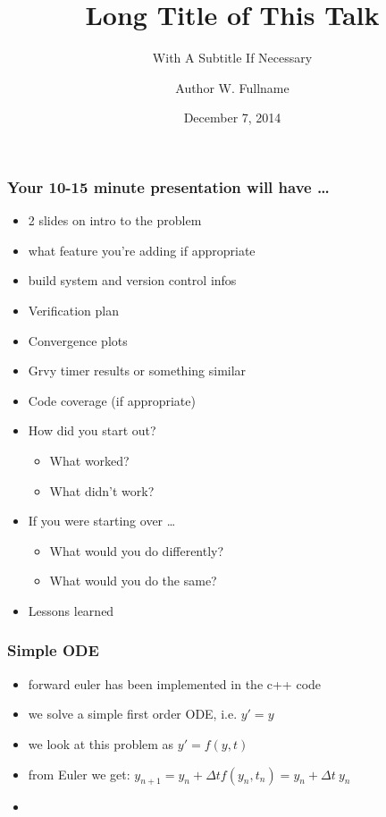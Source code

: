 \documentclass[mathserif]{beamer}
\date{December 7, 2014}
\author[A. W. Fullname]{Author W. Fullname}
\institute{The University of Texas at Austin}
\title[Short Title]{Long Title of This Talk}
\subtitle{With A Subtitle If Necessary}
\begin{document}
\begin{frame}
\begin{center}
\end{center}
\titlepage
\begin{flushright}
\end{flushright}
\end{frame}

\begin{frame}
\frametitle{Your 10-15 minute presentation will have \ldots}

\begin{itemize}
\item 2 slides on intro to the problem
\item what feature you're adding if appropriate
\item build system and version control infos
\item Verification plan
\item Convergence plots
\item Grvy timer results or something similar
\item Code coverage (if appropriate)
\item How did you start out?
\begin{itemize}
\item What worked?
\item What didn't work?
\end{itemize}
\item If you were starting over \ldots
\begin{itemize}
\item What would you do differently?
\item What would you do the same?
\end{itemize}
\item Lessons learned
\end{itemize}

\end{frame}

\begin{frame}
\frametitle{Simple ODE}

\begin{itemize}
\item forward euler has been implemented in the c++ code
\item we solve a simple first order ODE, i.e. $y'=y$
\item we look at this problem as $y' = f(y,t)$
\item from Euler we get: $y_{n+1} = y_n + \Delta t f(y_n, t_n)= y_n + \Delta t ~ y_n$
\item 
\end{itemize}

\end{frame}
\end{document}
